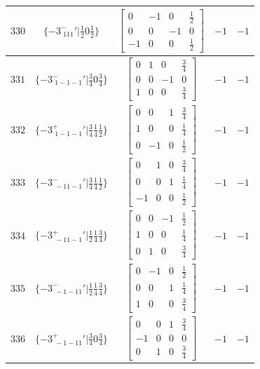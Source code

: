 \documentclass[fleqn,8pt]{jsarticle}
\begin{document}
\begin{longtable}{ccccc}
$ 330 $ & $ \{-3^{-}_{\,\,111}{}'|\frac{1}{2} 0 \frac{1}{2}\} $ & $ \begin{bmatrix} 0 & -1 & 0 & \frac{1}{2} \\ 0 & 0 & -1 & 0 \\ -1 & 0 & 0 & \frac{1}{2} \end{bmatrix} $ & $ -1 $ & $ -1 $ \\ \hline
$ 331 $ & $ \{-3^{-}_{\,\,1-1-1}{}'|\frac{3}{4} 0 \frac{3}{4}\} $ & $ \begin{bmatrix} 0 & 1 & 0 & \frac{3}{4} \\ 0 & 0 & -1 & 0 \\ 1 & 0 & 0 & \frac{3}{4} \end{bmatrix} $ & $ -1 $ & $ -1 $ \\ \hline
$ 332 $ & $ \{-3^{+}_{\,\,1-1-1}{}'|\frac{3}{4} \frac{1}{4} \frac{1}{2}\} $ & $ \begin{bmatrix} 0 & 0 & 1 & \frac{3}{4} \\ 1 & 0 & 0 & \frac{1}{4} \\ 0 & -1 & 0 & \frac{1}{2} \end{bmatrix} $ & $ -1 $ & $ -1 $ \\ \hline
$ 333 $ & $ \{-3^{-}_{\,\,-11-1}{}'|\frac{3}{4} \frac{1}{4} \frac{1}{2}\} $ & $ \begin{bmatrix} 0 & 1 & 0 & \frac{3}{4} \\ 0 & 0 & 1 & \frac{1}{4} \\ -1 & 0 & 0 & \frac{1}{2} \end{bmatrix} $ & $ -1 $ & $ -1 $ \\ \hline
$ 334 $ & $ \{-3^{+}_{\,\,-11-1}{}'|\frac{1}{2} \frac{1}{4} \frac{3}{4}\} $ & $ \begin{bmatrix} 0 & 0 & -1 & \frac{1}{2} \\ 1 & 0 & 0 & \frac{1}{4} \\ 0 & 1 & 0 & \frac{3}{4} \end{bmatrix} $ & $ -1 $ & $ -1 $ \\ \hline
$ 335 $ & $ \{-3^{-}_{\,\,-1-11}{}'|\frac{1}{2} \frac{1}{4} \frac{3}{4}\} $ & $ \begin{bmatrix} 0 & -1 & 0 & \frac{1}{2} \\ 0 & 0 & 1 & \frac{1}{4} \\ 1 & 0 & 0 & \frac{3}{4} \end{bmatrix} $ & $ -1 $ & $ -1 $ \\ \hline
$ 336 $ & $ \{-3^{+}_{\,\,-1-11}{}'|\frac{3}{4} 0 \frac{3}{4}\} $ & $ \begin{bmatrix} 0 & 0 & 1 & \frac{3}{4} \\ -1 & 0 & 0 & 0 \\ 0 & 1 & 0 & \frac{3}{4} \end{bmatrix} $ & $ -1 $ & $ -1 $ \\ \hline

\end{longtable}
\end{document}
